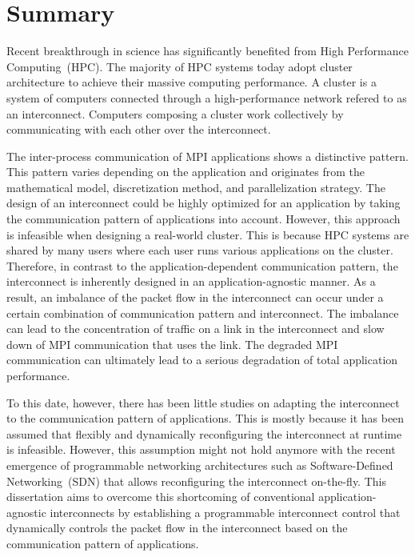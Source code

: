 \chapter*{Summary}

Recent breakthrough in science has significantly benefited from High
Performance Computing~(HPC). The majority of HPC systems today adopt cluster
architecture to achieve their massive computing performance. A cluster is a
system of computers connected through a high-performance network refered to as
an interconnect. Computers composing a cluster work collectively by
communicating with each other over the interconnect.

The inter-process communication of MPI applications shows a distinctive
pattern. This pattern varies depending on the application and originates from
the mathematical model, discretization method, and parallelization strategy.
The design of an interconnect could be highly optimized for an
application by taking the communication pattern of applications into account.
However, this approach is infeasible when designing a
real-world cluster. This is because HPC systems are shared by many users
where each user runs various applications on the cluster. Therefore, in
contrast to the application-dependent communication pattern, the interconnect
is inherently designed in an application-agnostic manner.
As a result, an imbalance of the packet flow in the interconnect can occur
under a certain combination of communication pattern and interconnect.
The imbalance can lead to the concentration of traffic on a link in the
interconnect and slow down of MPI communication that uses the link. The
degraded MPI communication can ultimately lead to a serious degradation of
total application performance.

To this date, however, there has been little studies on adapting the
interconnect to the communication pattern of applications. This is mostly
because it has been assumed that flexibly and dynamically reconfiguring the
interconnect at runtime is infeasible. However, this assumption might not hold
anymore with the recent emergence of programmable networking architectures
such as Software-Defined Networking~(SDN) that
allows reconfiguring the interconnect on-the-fly.
This dissertation aims to overcome this shortcoming of
conventional application-agnostic interconnects by establishing a programmable
interconnect control that dynamically controls the packet flow in the
interconnect based on the communication pattern of applications.

